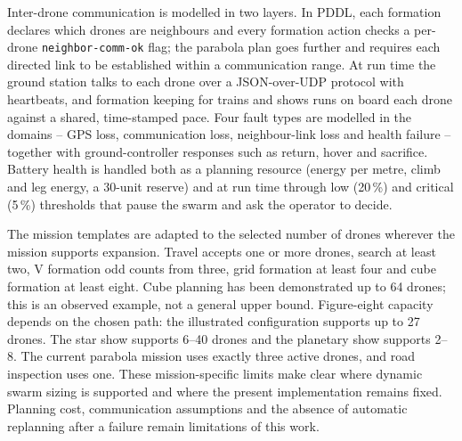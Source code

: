 \documentclass[11pt,a4paper,oneside]{report}
\newcommand{\addfront}[1]{%
  \addtocontents{toc}{\protect\noindent\protect\rule{0pt}{1.5em}\protect\textbf{#1}\protect\hfill\protect\textbf{\thepage}\protect\par}}
\newcommand{\code}[1]{\texttt{#1}}
\begin{document}
Inter-drone communication is modelled in two layers. In PDDL, each formation declares which
drones are neighbours and every formation action checks a per-drone \code{neighbor-comm-ok}
flag; the parabola plan goes further and requires each directed link to be established within
a communication range. At run time the ground station talks to each drone over a JSON-over-UDP
protocol with heartbeats, and formation keeping for trains and shows runs on board each drone
against a shared, time-stamped pace. Four fault types are modelled in the domains -- GPS loss,
communication loss, neighbour-link loss and health failure -- together with ground-controller
responses such as return, hover and sacrifice. Battery health is handled both as a planning
resource (energy per metre, climb and leg energy, a 30-unit reserve) and at run time through
low (20\,\%) and critical (5\,\%) thresholds that pause the swarm and ask the operator to decide.

The mission templates are adapted to the selected number of drones wherever
the mission supports expansion. Travel accepts one or more drones, search at
least two, V formation odd counts from three, grid formation at least four and
cube formation at least eight. Cube planning has been demonstrated up to
64 drones; this is an observed example, not a general upper bound. Figure-eight
capacity depends on the chosen path: the illustrated configuration supports
up to 27 drones. The star show supports 6--40 drones and the planetary show
supports 2--8. The current parabola mission uses exactly three active drones,
and road inspection uses one. These mission-specific limits make clear where
dynamic swarm sizing is supported and where the present implementation remains
fixed. Planning cost, communication assumptions and the absence of automatic
replanning after a failure remain limitations of this work.

\tableofcontents

\clearpage
\addfront{LIST OF TABLES}
\listoftables
\clearpage
\addfront{LIST OF FIGURES}
\begingroup{}\listoffigures\endgroup
\end{document}
